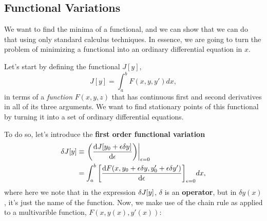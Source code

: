 \subsection{Functional Variations}
We want to find the minima of a functional, and we can show that we can do that using only standard calculus techniques. In essence, we are going to turn the problem of minimizing a functional into an ordinary differential equation in $x$.

Let's start by defining the functional $J[y]$,
\begin{equation}
  \label{eq:generic_functional}
  J[y] = \int_a^b F(x, y, y') dx,
\end{equation}
in terms of a \emph{function} $F(x, y, z)$ that has continuous first and second derivatives in all of its three arguments. We want to find stationary points  of this functional by turning it into a set of ordinary differential equations.

To do so, let's introduce the \textbf{first order functional variation}
\begin{equation}
  \label{eq:first_order_functional_variation}
  \begin{split}
    \var{J[y]} & \equiv \eval{\qty(\dv{J[y_0+\epsilon \delta y]}{\epsilon})}_{\epsilon=0}\\
    & = \int_a^b \qty[\dv{F(x, y_0 + \epsilon \delta y, y_0' + \epsilon \delta y')}{\epsilon}]_{\epsilon = 0} dx,    
  \end{split}
\end{equation}
where here we note that in the expression $\var{J[y]}$, $\delta$ is an \textbf{operator}, but in $\delta y(x)$, it's just the name of the function. Now, we make use of the chain rule as applied to a multivarible function, $F(x, y(x), y'(x))$:

